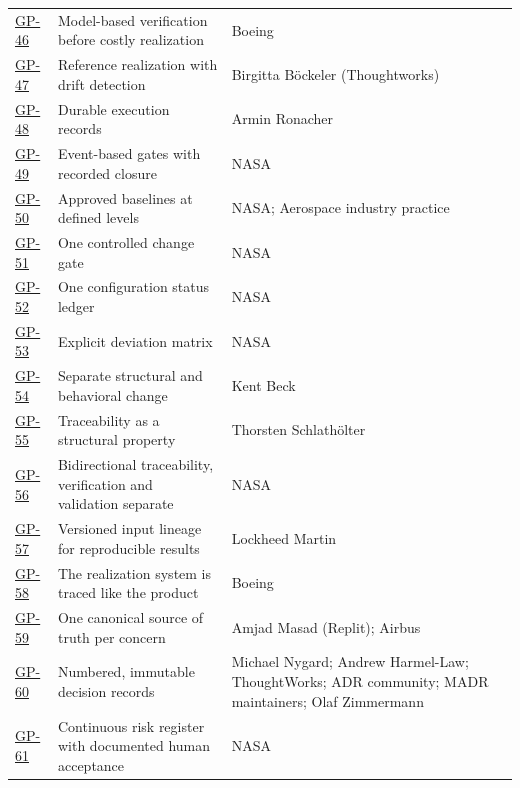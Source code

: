 \begin{longtable}{@{}l p{} p{} p{}@{}}
\hyperlink{gp-46}{GP-46} & Model-based verification before costly realization & Boeing & \citep{ps-hannover-boeing} \\
\hyperlink{gp-47}{GP-47} & Reference realization with drift detection & Birgitta B\"ockeler (Thoughtworks) & \citep{ps-bockeler-anchoring} \\
\hyperlink{gp-48}{GP-48} & Durable execution records & Armin Ronacher & \citep{ps-ronacher-agentic} \\
\hyperlink{gp-49}{GP-49} & Event-based gates with recorded closure & NASA & \citep{ps-nasa-npr7123} \\
\hyperlink{gp-50}{GP-50} & Approved baselines at defined levels & NASA; Aerospace industry practice & \citep{ps-nasa-seh-cm,ps-zheng-baseline} \\
\hyperlink{gp-51}{GP-51} & One controlled change gate & NASA & \citep{ps-nasa-seh-cm} \\
\hyperlink{gp-52}{GP-52} & One configuration status ledger & NASA & \citep{ps-nasa-seh-cm} \\
\hyperlink{gp-53}{GP-53} & Explicit deviation matrix & NASA & \citep{ps-nasa-npr7123} \\
\hyperlink{gp-54}{GP-54} & Separate structural and behavioral change & Kent Beck & \citep{ps-beck-augmented} \\
\hyperlink{gp-55}{GP-55} & Traceability as a structural property & Thorsten Schlath\"olter & \citep{ps-schlatholter-reqtocode} \\
\hyperlink{gp-56}{GP-56} & Bidirectional traceability, verification and validation separate & NASA & \citep{ps-nasa-seh-app} \\
\hyperlink{gp-57}{GP-57} & Versioned input lineage for reproducible results & Lockheed Martin & \citep{ps-lakefs-lockheed} \\
\hyperlink{gp-58}{GP-58} & The realization system is traced like the product & Boeing & \citep{ps-boeing-thread} \\
\hyperlink{gp-59}{GP-59} & One canonical source of truth per concern & Amjad Masad (Replit); Airbus & \citep{ps-masad-selfdriving,ps-airbus-collab} \\
\hyperlink{gp-60}{GP-60} & Numbered, immutable decision records & Michael Nygard; Andrew Harmel-Law; ThoughtWorks; ADR community; MADR maintainers; Olaf Zimmermann & \citep{ps-nygard-adr,ps-harmellaw-scaling,ps-thoughtworks-adr,ps-adr-github,ps-madr,ps-zimmermann-anydr} \\
\hyperlink{gp-61}{GP-61} & Continuous risk register with documented human acceptance & NASA & \citep{ps-nasa-swe086} \\

\end{longtable}
